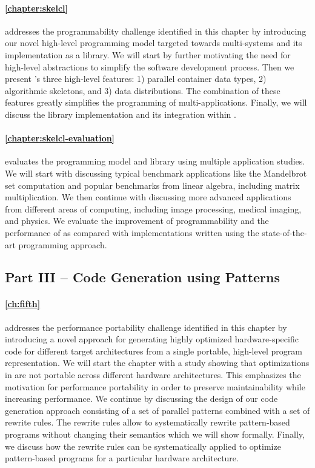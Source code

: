 \paragraph{\autoref{chapter:skelcl}} addresses the programmability challenge identified in this chapter by introducing our novel \SkelCL high-level programming model targeted towards multi-\GPU systems and its implementation as a \Cpp library.
We will start by further motivating the need for high-level abstractions to simplify the software development process.
Then we present \SkelCL's three high-level features:
1) parallel container data types, 2) algorithmic skeletons, and 3) data distributions.
The combination of these features greatly simplifies the programming of multi-\GPU applications.
Finally, we will discuss the \SkelCL library implementation and its integration within \Cpp.

\paragraph{\autoref{chapter:skelcl-evaluation}} evaluates the \SkelCL programming model and library using multiple application studies.
We will start with discussing typical benchmark applications like the Mandelbrot set computation and popular benchmarks from linear algebra, including matrix multiplication.
We then continue with discussing more advanced applications from different areas of computing, including image processing, medical imaging, and physics.
We evaluate the improvement of programmability and the performance of \SkelCL as compared with implementations written using the state-of-the-art \OpenCL programming approach.


\subsection*{Part III -- Code Generation using Patterns}

\paragraph{\autoref{ch:fifth}} addresses the performance portability challenge identified in this chapter by introducing a novel approach for generating highly optimized hardware-specific code for different target architectures from a single portable, high-level program representation.
We will start the chapter with a study showing that optimizations in \OpenCL are not portable across different hardware architectures.
This emphasizes the motivation for performance portability in order to preserve maintainability while increasing performance.
We continue by discussing the design of our code generation approach consisting of a set of parallel patterns combined with a set of rewrite rules.
The rewrite rules allow to systematically rewrite pattern-based programs without changing their semantics which we will show formally.
Finally, we discuss how the rewrite rules can be systematically applied to optimize pattern-based programs for a particular hardware architecture.

